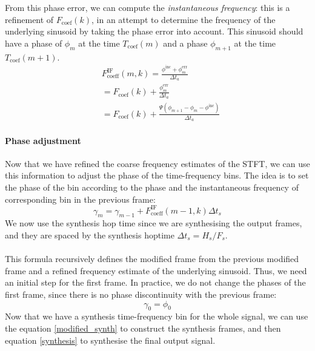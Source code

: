 \documentclass[letterpaper]{article}
\theoremstyle{definition}
\theoremstyle{remark}
\theoremstyle{plain}
\begin{document}
From this phase error, we can compute the \emph{instantaneous frequency}: this
is a refinement of \(F_{\text{coef}}(k)\), in an attempt to determine the
frequency of the underlying sinusoid by taking the phase error into account.
This sinusoid should have a phase of
\(\phi_m\) at the time \(T_{\text{coef}}(m)\) and a phase \(\phi_{m+1}\) at
the time \(T_{\text{coef}}(m+1)\).
\begin{align}
    &F_{\text{coeff}}^{\text{IF}}(m,k)=\frac{\phi^{\text{inc}} + \phi^{\text{err}}_m}{\Delta t_a}\\
    &=F_{\text{coef}}(k) + \frac{\phi^{\text{err}}_m}{\Delta t_a}\\
    &=F_{\text{coef}}(k) + \frac{\Psi(\phi_{m+1} - \phi_m - \phi^{\text{inc}})}{\Delta t_a}
\end{align}

\paragraph{Phase adjustment}
Now that we have refined the coarse frequency estimates of the STFT, we can use
this information to adjust the phase of the time-frequency bins. The idea is to
set the phase of the bin according to the phase and the instantaneous frequency
of corresponding bin in the previous frame:
\begin{equation}
		\gamma_m=\gamma_{m-1} + F_{\text{coeff}}^{\text{IF}}(m-1,k)\Delta t_s
\end{equation}
We now use the synthesis hop time since we are synthesising the output frames,
and they are spaced by the synthesis hoptime \(\Delta t_s=H_s/F_s\).

\paragraph{}
This formula recursively defines the modified frame from the previous modified
frame and a refined frequency estimate of the underlying sinusoid. Thus, we
need an initial step for the first frame. In practice, we do not change the
phases of the first frame, since there is no phase discontinuity with the
previous frame:
\begin{equation}
	\label{initial_phase}
	\gamma_0=\phi_0
\end{equation}
Now that we have a synthesis time-frequency bin for the whole signal, we can
use the equation \eqref{modified_synth} to construct the synthesis frames, and
then equation \eqref{synthesis} to synthesise the final output signal.
\end{document}
